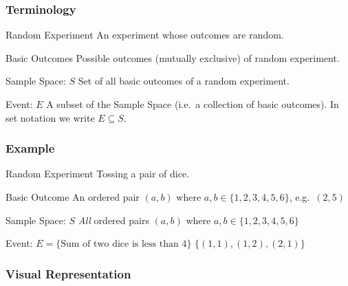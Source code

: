 \documentclass[handout]{beamer}
\begin{document}
\begin{frame}
\frametitle{Terminology}
\begin{block}{Random Experiment}
An experiment whose outcomes are random.
\end{block}
\begin{block}{Basic Outcomes}
Possible outcomes (mutually exclusive) of random experiment.
\end{block}
\begin{block}{Sample Space: $S$}
Set of all basic outcomes of a random experiment.
\end{block}

\begin{block}{Event: $E$}
A subset of the Sample Space (i.e.\ a collection of basic outcomes). In set notation we write $E \subseteq S$.
\end{block}

\end{frame}
\begin{frame}
\frametitle{Example}
\begin{block}{Random Experiment}
Tossing a pair of dice.
\end{block}
\begin{block}{Basic Outcome}
An ordered pair $(a, b)$ where $a,b \in \{1, 2, 3, 4, 5, 6\}$, e.g.\ $(2,5)$
\end{block}
\begin{block}{Sample Space: $S$}
\emph{All} ordered pairs $(a, b)$ where $a,b \in \{1, 2, 3, 4, 5, 6\}$
\end{block}

\begin{block}{Event: $E = \{\mbox{Sum of two dice is less than 4}\}$}
$\{(1,1), (1,2), (2,1)\}$
\end{block}

\end{frame}
\begin{frame}
\frametitle{Visual Representation}
\begin{figure}
\centering
{}
\end{figure}
\end{frame}
\end{document}
